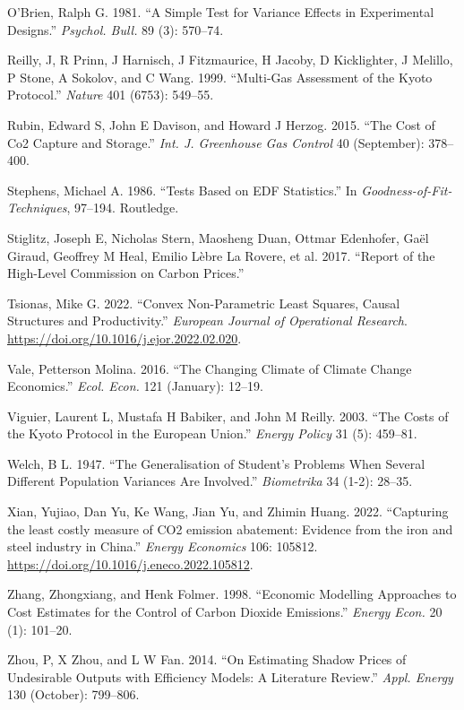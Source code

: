 \documentclass[
  letterpaper,
  DIV=11,
  numbers=noendperiod]{scrartcl}
\newlength{\cslhangindent}
\newlength{\cslentryspacingunit} %
\newenvironment{CSLReferences}[2] %
 {%
  \setlength{\parindent}{0pt}
  \ifodd #1
  \let\oldpar\par
  \def\par{\hangindent=\cslhangindent\oldpar}
  \fi
  \setlength{\parskip}{#2\cslentryspacingunit}
 }%
 {}
\begin{document}
\begin{CSLReferences}{1}{0}
\leavevmode{}%
O'Brien, Ralph G. 1981. {``A Simple Test for Variance Effects in
Experimental Designs.''} \emph{Psychol. Bull.} 89 (3): 570--74.

\leavevmode{}%
Reilly, J, R Prinn, J Harnisch, J Fitzmaurice, H Jacoby, D Kicklighter,
J Melillo, P Stone, A Sokolov, and C Wang. 1999. {``Multi-Gas Assessment
of the Kyoto Protocol.''} \emph{Nature} 401 (6753): 549--55.

\leavevmode{}%
Rubin, Edward S, John E Davison, and Howard J Herzog. 2015. {``The Cost
of {Co2} Capture and Storage.''} \emph{Int. J. Greenhouse Gas Control}
40 (September): 378--400.

\leavevmode{}%
Stephens, Michael A. 1986. {``Tests Based on {EDF} Statistics.''} In
\emph{Goodness-of-Fit-Techniques}, 97--194. Routledge.

\leavevmode{}%
Stiglitz, Joseph E, Nicholas Stern, Maosheng Duan, Ottmar Edenhofer,
Gaël Giraud, Geoffrey M Heal, Emilio Lèbre La Rovere, et al. 2017.
{``Report of the High-Level Commission on Carbon Prices.''}

\leavevmode{}%
Tsionas, Mike G. 2022. {``{Convex Non-Parametric Least Squares, Causal
Structures and Productivity}.''} \emph{European Journal of Operational
Research}. \url{https://doi.org/10.1016/j.ejor.2022.02.020}.

\leavevmode{}%
Vale, Petterson Molina. 2016. {``The Changing Climate of Climate Change
Economics.''} \emph{Ecol. Econ.} 121 (January): 12--19.

\leavevmode{}%
Viguier, Laurent L, Mustafa H Babiker, and John M Reilly. 2003. {``The
Costs of the Kyoto Protocol in the European Union.''} \emph{Energy
Policy} 31 (5): 459--81.

\leavevmode{}%
Welch, B L. 1947. {``The Generalisation of Student's Problems When
Several Different Population Variances Are Involved.''}
\emph{Biometrika} 34 (1-2): 28--35.

\leavevmode{}%
Xian, Yujiao, Dan Yu, Ke Wang, Jian Yu, and Zhimin Huang. 2022.
{``{Capturing the least costly measure of CO2 emission abatement:
Evidence from the iron and steel industry in China}.''} \emph{Energy
Economics} 106: 105812.
\url{https://doi.org/10.1016/j.eneco.2022.105812}.

\leavevmode{}%
Zhang, Zhongxiang, and Henk Folmer. 1998. {``Economic Modelling
Approaches to Cost Estimates for the Control of Carbon Dioxide
Emissions.''} \emph{Energy Econ.} 20 (1): 101--20.

\leavevmode{}%
Zhou, P, X Zhou, and L W Fan. 2014. {``On Estimating Shadow Prices of
Undesirable Outputs with Efficiency Models: A Literature Review.''}
\emph{Appl. Energy} 130 (October): 799--806.

\end{CSLReferences}
\end{document}
